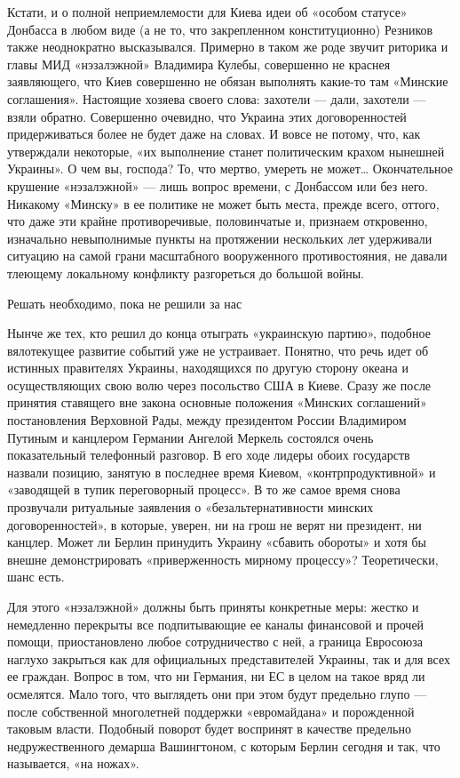 \documentclass[a4paper,11pt]{extreport}
\begin{document}
Кстати, и о полной неприемлемости для Киева идеи об «особом статусе» Донбасса в любом виде (а не то, что закрепленном конституционно) Резников также неоднократно высказывался. Примерно в таком же роде звучит риторика и главы МИД «нэзалэжной» Владимира Кулебы, совершенно не краснея заявляющего, что Киев совершенно не обязан выполнять какие-то там «Минские соглашения». Настоящие хозяева своего слова: захотели --- дали, захотели --- взяли обратно. Совершенно очевидно, что Украина этих договоренностей придерживаться более не будет даже на словах. И вовсе не потому, что, как утверждали некоторые, «их выполнение станет политическим крахом нынешней Украины». О чем вы, господа? То, что мертво, умереть не может… Окончательное крушение «нэзалэжной» --- лишь вопрос времени, с Донбассом или без него. Никакому «Минску» в ее политике не может быть места, прежде всего, оттого, что даже эти крайне противоречивые, половинчатые и, признаем откровенно, изначально невыполнимые пункты на протяжении нескольких лет удерживали ситуацию на самой грани масштабного вооруженного противостояния, не давали тлеющему локальному конфликту разгореться до большой войны.

Решать необходимо, пока не решили за нас

Нынче же тех, кто решил до конца отыграть «украинскую партию», подобное
вялотекущее развитие событий уже не устраивает. Понятно, что речь идет об
истинных правителях Украины, находящихся по другую сторону океана и
осуществляющих свою волю через посольство США в Киеве. Сразу же после принятия
ставящего вне закона основные положения «Минских соглашений» постановления
Верховной Рады, между президентом России Владимиром Путиным и канцлером
Германии Ангелой Меркель состоялся очень показательный телефонный разговор. В
его ходе лидеры обоих государств назвали позицию, занятую в последнее время
Киевом, «контрпродуктивной» и «заводящей в тупик переговорный процесс». В то же
самое время снова прозвучали ритуальные заявления о «безальтернативности
минских договоренностей», в которые, уверен, ни на грош не верят ни президент,
ни канцлер. Может ли Берлин принудить Украину «сбавить обороты» и хотя бы
внешне демонстрировать «приверженность мирному процессу»? Теоретически, шанс
есть.

Для этого «нэзалэжной» должны быть приняты конкретные меры: жестко и немедленно
перекрыты все подпитывающие ее каналы финансовой и прочей помощи,
приостановлено любое сотрудничество с ней, а граница Евросоюза наглухо
закрыться как для официальных представителей Украины, так и для всех ее
граждан. Вопрос в том, что ни Германия, ни ЕС в целом на такое вряд ли
осмелятся. Мало того, что выглядеть они при этом будут предельно глупо --- после
собственной многолетней поддержки «евромайдана» и порожденной таковым власти.
Подобный поворот будет воспринят в качестве предельно недружественного демарша
Вашингтоном, с которым Берлин сегодня и так, что называется, «на ножах».
\end{document}
